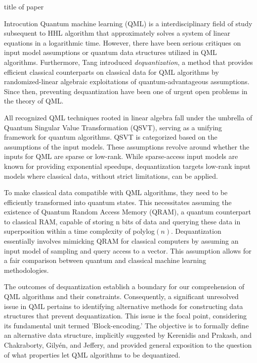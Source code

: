 \documentclass[10pt,twoside,reqno]{amsart} %
\makeatletter
\renewcommand{\section}{\@startsection{section}{1}
   \z@{.7\linespacing\@plus\linespacing}{.5\linespacing}
   {\normalfont\upshape\bfseries\centering}}
\theoremstyle{plain}
\theoremstyle{definition}
\makeatother
\begin{document}
\pagestyle{myheadings}
         {\centerline {\scriptsize  title of paper  }}


\bigskip
\section{Introcution}
Quantum machine learning (QML) is a interdisciplinary field of study subsequent
to HHL algorithm \cite{harrow2009} that approximately solves a system of linear
equations in a logarithmic time. However, there have been serious critiques 
\cite{aaronson2015} on input model assumptions or quantum data structures
utilized in QML algorithms. Furthermore, Tang \cite{tang2019} introduced 
\emph{dequantization}, a method that provides efficient classical counterparts
on classical data for QML algorithms by randomized-linear algebraic exploitations
of quantum-advantageous assumptions. Since then, preventing dequantization
have been one of urgent open problems \cite{tang2023} in the theory of QML.

All recognized QML techniques rooted in linear algebra fall under the umbrella
of Quantum Singular Value Transformation (QSVT), serving as a unifying framework
for quantum algorithms. QSVT is categorized based on the assumptions of the input
models. These assumptions revolve around whether the inputs for QML are sparse or
low-rank. While sparse-access input models are known for providing exponential
speedups, dequantization targets low-rank input models where classical data, 
without strict limitations, can be applied.

To make classical data compatible with QML algorithms, they need to be efficiently
transformed into quantum states. This necessitates assuming the existence of
Quantum Random Access Memory (QRAM), a quantum counterpart to classical RAM, 
capable of storing n bits of data and querying these data in superposition 
within a time complexity of polylog$(n)$. Dequantization essentially involves
mimicking QRAM for classical computers by assuming an input model of sampling
and query access to a vector. This assumption allows for a fair comparison
between quantum and classical machine learning methodologies.

The outcomes of dequantization establish a boundary for our comprehension of QML
algorithms and their constraints. Consequently, a significant unresolved issue
in QML pertains to identifying alternative methods for constructing data 
structures that prevent dequantization. This issue is the focal point, 
considering its fundamental unit termed 'Block-encoding.' The objective is to
formally define an alternative data structure, implicitly suggested by Kerenidis
and Prakash, and Chakraborty, Gilyén, and Jeffery, and provided general exposition
to the question of what properties let QML algorithms to be dequantized.
\end{document}
